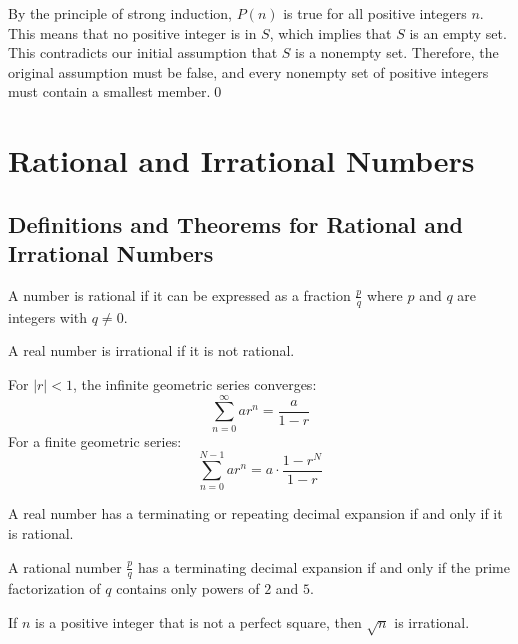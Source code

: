 By the principle of strong induction, $P(n)$ is true for all positive integers $n$. This means that no positive integer is in $S$, which implies that $S$ is an empty set.
This contradicts our initial assumption that $S$ is a nonempty set.
Therefore, the original assumption must be false, and every nonempty set of positive integers must contain a smallest member.\qed

\section{Rational and Irrational Numbers}

\subsection*{Definitions and Theorems for Rational and Irrational Numbers}

\begin{definition}
A number is rational if it can be expressed as a fraction $\frac{p}{q}$ where $p$ and $q$ are integers with $q \neq 0$.
\end{definition}

\begin{definition}
A real number is irrational if it is not rational.
\end{definition}

\begin{theorem}
For $|r| < 1$, the infinite geometric series converges:
\[
\sum_{n=0}^{\infty} ar^n = \frac{a}{1-r}
\]
For a finite geometric series:
\[
\sum_{n=0}^{N-1} ar^n = a \cdot \frac{1-r^N}{1-r}
\]
\end{theorem}

\begin{theorem}
A real number has a terminating or repeating decimal expansion if and only if it is rational.
\end{theorem}

\begin{theorem}
A rational number $\frac{p}{q}$ has a terminating decimal expansion if and only if the prime factorization of $q$ contains only powers of $2$ and $5$.
\end{theorem}

\begin{theorem}
If $n$ is a positive integer that is not a perfect square, then $\sqrt{n}$ is irrational.
\end{theorem}

